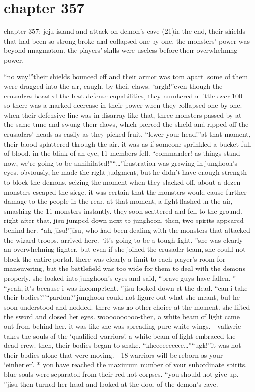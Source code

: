 \section{chapter 357}

chapter 357: jeju island and attack on demon’s cave (21)in the end, their shields that had been so strong broke and collapsed one by one.
 the monsters’ power was beyond imagination.
 the players’ skills were useless before their overwhelming power.





“no way!”their shields bounced off and their armor was torn apart.
 some of them were dragged into the air, caught by their claws.
“argh!”even though the crusaders boasted the best defense capabilities, they numbered a little over 100.
 so there was a marked decrease in their power when they collapsed one by one.
when their defensive line was in disarray like that, three monsters passed by at the same time and swung their claws, which pierced the shield and ripped off the crusaders’ heads as easily as they picked fruit.
“lower your head!”at that moment, their blood splattered through the air.
 it was as if someone sprinkled a bucket full of blood.
 in the blink of an eye, 11 members fell.
“commander! as things stand now, we’re going to be annihilated!”“…”frustration was growing in junghoon’s eyes.
 obviously, he made the right judgment, but he didn’t have enough strength to block the demons.
seizing the moment when they slacked off, about a dozen monsters escaped the siege.
 it was certain that the monsters would cause further damage to the people in the rear.
at that moment, a light flashed in the air, smashing the 11 monsters instantly.
 they soon scattered and fell to the ground.
right after that, jisu jumped down next to junghoon.
 then, two spirits appeared behind her.
“ah, jisu!”jisu, who had been dealing with the monsters that attacked the wizard troops, arrived here.
“it’s going to be a tough fight.
”she was clearly an overwhelming fighter, but even if she joined the crusader team, she could not block the entire portal.
 there was clearly a limit to each player’s room for maneuvering, but the battlefield was too wide for them to deal with the demons properly.
she looked into junghoon’s eyes and said, “brave guys have fallen.
”
“yeah, it’s because i was incompetent.
”jisu looked down at the dead.
“can i take their bodies?”“pardon?”junghoon could not figure out what she meant, but he soon understood and nodded.
there was no other choice at the moment.
 she lifted the sword and closed her eyes.
woooooooooo-then, a white beam of light came out from behind her.
 it was like she was spreading pure white wings.
- valkyrie takes the souls of the ‘qualified warriors’.
a white beam of light embraced the dead crew.
 then, their bodies began to shake.
“kheeeeeeeeee…”“ugh!”it was not their bodies alone that were moving.
- 18 warriors will be reborn as your ‘einherier’.
* you have reached the maximum number of your subordinate spirits.
blue souls were separated from their red hot corpses.
“you should not give up.
”jisu then turned her head and looked at the door of the demon’s cave.

